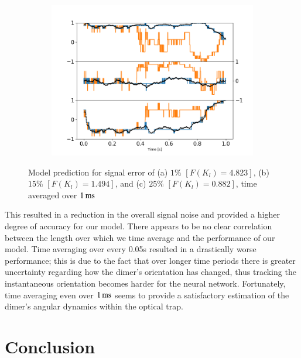 \documentclass[final,  3p]{elsarticle}
\begin{document}
\begin{figure}[h]
\begin{subfigure}{0.32\textwidth}
		\includegraphics[width=\textwidth]{./Images/fig11c.png}
	\end{subfigure}
	\caption{Model prediction for signal error of (a) $1\%$ $[F(K_l)=4.823]$,  (b) $15\%$ $[F(K_l)=1.494]$, and (c) $25\%$ $[F(K_l)=0.882]$, time averaged over $1\,{\rm ms}$}
	\label{fig:time average}
\end{figure}
This resulted in a reduction in the overall signal noise and provided a higher degree of accuracy for our model. There appears to be no clear correlation between the length over which we time average and the performance of our model. Time averaging over every 0.05s resulted in a drastically worse performance; this is due to the fact that over longer time periods there is greater uncertainty regarding how the dimer's orientation has changed, thus tracking the instantaneous orientation becomes harder for the neural network. Fortunately, time averaging even over $1\,{\rm ms}$ seems to provide a satisfactory estimation of the dimer's angular dynamics within the optical trap. 

\section{Conclusion}
\label{sec:Conclusion}
\end{document}
